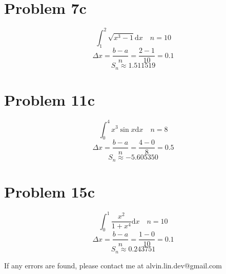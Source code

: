 \documentclass[letterpaper, 12pt]{article}
\newcommand*{\diff}{\mathrm{d}}
\begin{document}
\section*{Problem 7c}
\[ \int_{1}^{2}{\sqrt{x^{3}-1}\diff{x}} \quad n = 10 \]
\[ \Delta x = \frac{b-a}{n} = \frac{2-1}{10} = 0.1 \]
\[ S_{n} \approx 1.511519 \]

\section*{Problem 11c}
\[ \int_{0}^{4}{x^{3}\sin{x}\diff{x}} \quad n = 8 \]
\[ \Delta x = \frac{b-a}{n} = \frac{4-0}{8} = 0.5 \]
\[ S_{n} \approx -5.605350 \]

\section*{Problem 15c}
\[ \int_{0}^{1}{\frac{x^{2}}{1+x^{4}}\diff{x}} \quad n = 10 \]
\[ \Delta x = \frac{b-a}{n} = \frac{1-0}{10} = 0.1 \]
\[ S_{n} \approx 0.243751 \]

\begin{center}
  If any errors are found, please contact me at alvin.lin.dev@gmail.com
\end{center}
\end{document}
